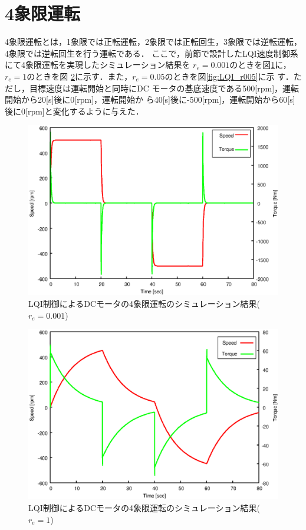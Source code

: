 \documentclass[a4paper,12pt]{jarticle}
\begin{document}
\section{4象限運転}
4象限運転とは，1象限では正転運転，2象限では正転回生，3象限では逆転運転，
4象限では逆転回生を行う運転である．
ここで，前節で設計したLQI速度制御系にて4象限運転を実現したシミュレーション結果を
$r_e=0.001$のときを図\ref{fig:LQI_r0001}に，$r_e=1$のときを図
\ref{fig:LQI_r1}に示す．また，$r_e=0.05$のときを図\ref{fig:LQI_r005}に示
す．ただし，目標速度は運転開始と同時にDC
モータの基底速度である500[rpm]，運転開始から20[s]後に0[rpm]，運転開始か
ら40[s]後に-500[rpm]，運転開始から60[s]後に0[rpm]と変化するように与えた．
%
\begin{figure}[htbp]
 \begin{center}
  \includegraphics[width = 150mm]{fig/LQI_r0001.eps}
 \end{center}
 \caption{LQI制御によるDCモータの4象限運転のシミュレーション結果($r_e=0.001$)}
 \label{fig:LQI_r0001}
\end{figure}
%
%
\begin{figure}[htbp]
 \begin{center}
  \includegraphics[width = 150mm]{fig/LQI_r1.eps}
 \end{center}
 \caption{LQI制御によるDCモータの4象限運転のシミュレーション結果($r_e=1$)}
 \label{fig:LQI_r1}
\end{figure}
\end{document}
